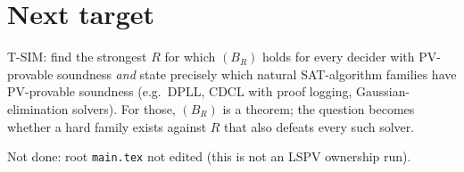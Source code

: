 \documentclass[11pt]{article}
\begin{document}
\section*{Next target}
T-SIM: find the strongest $R$ for which $(B_R)$ holds for every decider with PV-provable soundness \emph{and} state precisely which natural SAT-algorithm families have PV-provable soundness (e.g.\ DPLL, CDCL with proof logging, Gaussian-elimination solvers). For those, $(B_R)$ is a theorem; the question becomes whether a hard family exists against $R$ that also defeats every such solver.

\noindent Not done: root \texttt{main.tex} not edited (this is not an LSPV ownership run).
\end{document}

